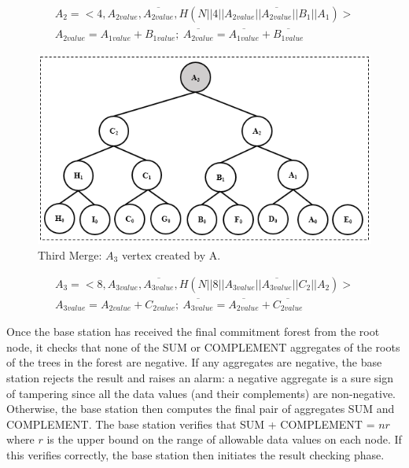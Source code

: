 		\begin{equation}
			\begin{array}{l}
				A_{2} = <4, A_{2value}, \overline{A_{2value}}, H(N || 4 || A_{2value} || \overline{A_{2value}} || B_{1} ||A_{1}) >\\
				A_{2value} = A_{1value} + B_{1value};\ \overline{A_{2value}} = \overline{A_{1value}} + \overline{B_{1value}}
			\end{array}
		\end{equation}
		\begin{figure}[h!]
			\centering
			\includegraphics{images/commitment-tree-example-4-shia.png}
			\caption{Third Merge: $A_{3}$ vertex created by A.}
			\label{fig:commitment-tree-example-4-shia}
		\end{figure}
		\begin{equation}
			\begin{array}{l}
				A_{3} = <8, A_{3value}, \overline{A_{3value}}, H(N || 8 || A_{3value} || \overline{A_{3value}} || C_{2} ||A_{2}) >\\
				A_{3value} = A_{2value} + C_{2value};\ \overline{A_{3value}} = \overline{A_{2value}} + \overline{C_{2value}}
			\end{array}
		\end{equation}
		
		Once the base station has received the final commitment forest from the root node, it checks that none of the SUM or COMPLEMENT aggregates of the roots of the trees in the forest are negative. 
		If any aggregates are negative, the base station rejects the result and raises an alarm: a negative aggregate is a sure sign of tampering since all the data values (and their complements) are non-negative. 
		Otherwise, the base station then computes the final pair of aggregates SUM and COMPLEMENT. 
		The base station verifies that SUM + COMPLEMENT = $nr$ where $r$ is the upper bound on the range of allowable data values on each node. 
		If this verifies correctly, the base station then initiates the result checking phase.

